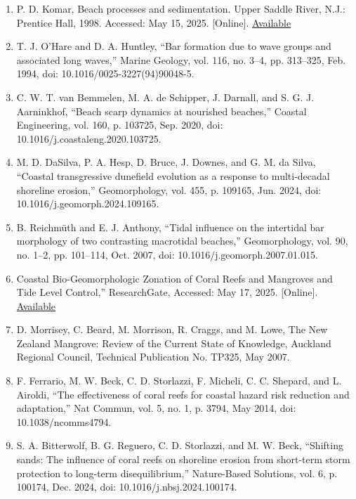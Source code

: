 \documentclass{article}
\begin{document}
\begin{enumerate}
    \item{P. D. Komar, Beach processes and sedimentation. Upper Saddle River, N.J.: Prentice Hall, 1998. Accessed: May 15, 2025. [Online]. \href{http://archive.org/details/beachprocessesse0002koma}{Available}}

    \item{T. J. O’Hare and D. A. Huntley, “Bar formation due to wave groups and associated long waves,” Marine Geology, vol. 116, no. 3–4, pp. 313–325, Feb. 1994, doi: 10.1016/0025-3227(94)90048-5.}

    \item{C. W. T. van Bemmelen, M. A. de Schipper, J. Darnall, and S. G. J. Aarninkhof, “Beach scarp dynamics at nourished beaches,” Coastal Engineering, vol. 160, p. 103725, Sep. 2020, doi: 10.1016/j.coastaleng.2020.103725.}

    \item{M. D. DaSilva, P. A. Hesp, D. Bruce, J. Downes, and G. M. da Silva, “Coastal transgressive dunefield evolution as a response to multi-decadal shoreline erosion,” Geomorphology, vol. 455, p. 109165, Jun. 2024, doi: 10.1016/j.geomorph.2024.109165.}

    \item{B. Reichmüth and E. J. Anthony, “Tidal influence on the intertidal bar morphology of two contrasting macrotidal beaches,” Geomorphology, vol. 90, no. 1–2, pp. 101–114, Oct. 2007, doi: 10.1016/j.geomorph.2007.01.015.}

    \item{Coastal Bio-Geomorphologic Zonation of Coral Reefs and Mangroves and Tide Level Control,” ResearchGate, Accessed: May 17, 2025. [Online]. \href{https://www.researchgate.net/publication/266092059_Coastal_Bio-Geomorphologic_Zonation_of_Coral_Reefs_and_Mangroves_and_Tide_Level_Control}{Available}}

    \item{D. Morrisey, C. Beard, M. Morrison, R. Craggs, and M. Lowe, The New Zealand Mangrove: Review of the Current State of Knowledge, Auckland Regional Council, Technical Publication No. TP325, May 2007.}

    \item{F. Ferrario, M. W. Beck, C. D. Storlazzi, F. Micheli, C. C. Shepard, and L. Airoldi, “The effectiveness of coral reefs for coastal hazard risk reduction and adaptation,” Nat Commun, vol. 5, no. 1, p. 3794, May 2014, doi: 10.1038/ncomms4794.}

    \item{S. A. Bitterwolf, B. G. Reguero, C. D. Storlazzi, and M. W. Beck, “Shifting sands: The influence of coral reefs on shoreline erosion from short-term storm protection to long-term disequilibrium,” Nature-Based Solutions, vol. 6, p. 100174, Dec. 2024, doi: 10.1016/j.nbsj.2024.100174.}


\end{enumerate}
\end{document}
